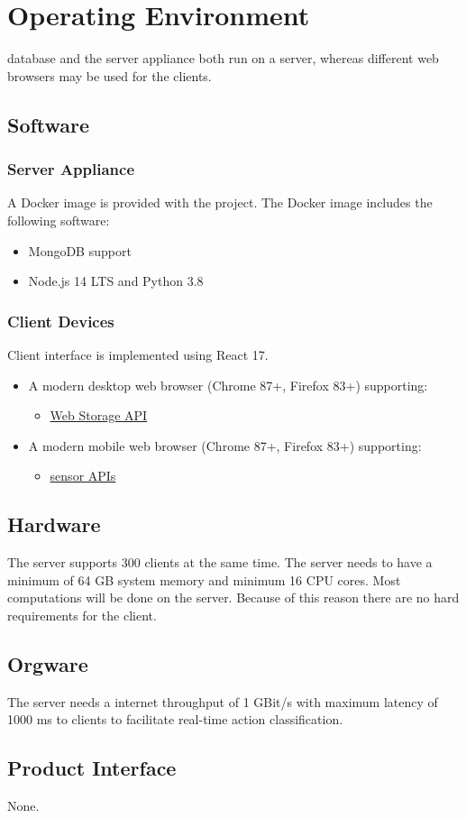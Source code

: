 \section{Operating Environment}

\Gls{database} and the server appliance both run on a server, whereas different web browsers may be used for the clients.

\subsection{Software}
\subsubsection{Server Appliance}
A \Gls{Docker} image is provided with the project. The \Gls{Docker} image includes the following software:
\begin{itemize}
    \item \gls{MongoDB} support
    \item \gls{Node.js} 14 LTS and Python 3.8
\end{itemize}
\subsubsection{Client Devices}
Client interface is implemented using \gls{React} 17.
\begin{itemize}
    \item A modern desktop web browser (Chrome 87+, Firefox 83+) supporting:
    \begin{itemize}
        \item \href{https://developer.mozilla.org/en-US/docs/Web/API/Web_Storage_API}{Web Storage API}
    \end{itemize}
    \item A modern mobile web browser (Chrome 87+, Firefox 83+) supporting:
    \begin{itemize}
        \item \href{https://developer.mozilla.org/en-US/docs/Web/API/Sensor_APIs}{\Gls{sensor} APIs}
    \end{itemize}
\end{itemize}

\subsection{Hardware}

The server supports 300 clients at the same time. The server needs to have a minimum of 64 GB system memory and minimum 16 CPU cores. Most computations will be done on the server. Because of this reason there are no hard requirements for the client.

\subsection{Orgware}
The server needs a internet throughput of 1 GBit/s with maximum latency of 1000 ms to clients to facilitate real-time action \gls{classification}.

\subsection{Product Interface}
None.